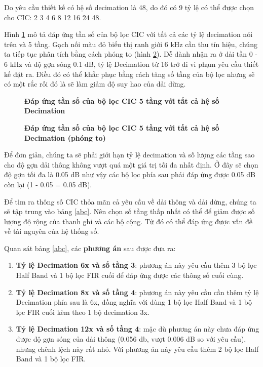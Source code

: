 Do yêu cầu thiết kế có hệ số decimation là 48, do đó có 9 tỷ lệ có thể được chọn cho CIC: 2 3 4 6 8 12 16 24 48.

Hình \ref{cic_ratios_overview} mô tả đáp ứng tần số của bộ lọc CIC với tất cả các tỷ lệ decimation nói trên và 5 tầng. Gạch nối màu đỏ biểu thị ranh giới 6 kHz cần thu tín hiệu, chúng ta tiếp tục phân tích bằng cách phóng to (hình \ref{cic_ratios_zoom}). Dễ dành nhận ra ở dải tần 0 - 6 kHz và độ gợn sóng 0.1 dB, tỷ lệ Decimation từ 16 trở đi vi phạm yêu cầu thiết kế đặt ra. Điều đó có thể khắc phục bằng cách tăng số tầng của bộ lọc nhưng sẽ có một rắc rối đó là sẽ làm giảm độ suy hao của dải dừng.

\begin{figure}[H]
    \centering
    
    \caption[Đáp ứng tần số của bộ lọc CIC 5 tầng với tất cả hệ số Decimation]{\bfseries \fontsize{12pt}{0pt}\selectfont Đáp ứng tần số của bộ lọc CIC 5 tầng với tất cả hệ số Decimation}
    \label{cic_ratios_overview}
\end{figure}

\begin{figure}[H]
    \centering
    
    \caption[Đáp ứng tần số của bộ lọc CIC 5 tầng với tất cả hệ số Decimation (phóng to)]{\bfseries \fontsize{12pt}{0pt}\selectfont Đáp ứng tần số của bộ lọc CIC 5 tầng với tất cả hệ số Decimation (phóng to)}
    \label{cic_ratios_zoom}
\end{figure}

Để đơn giản, chúng ta sẽ phải giới hạn tỷ lệ decimation và số lượng các tầng sao cho độ gợn dải thông không vượt quá một giá trị tối đa nhất định. Ở đây sẽ chọn độ gợn tối đa là 0.05 dB như vậy các bộ lọc phía sau phải đáp ứng được 0.05 dB còn lại (1 - 0.05 = 0.05 dB).

Để tìm ra thông số CIC thỏa mãn cả yêu cầu về dải thông và dải dừng, chúng ta sẽ tập trung vào bảng \ref{abc}. Nên chọn số tầng thấp nhất có thể để giảm được số lượng độ rộng của thanh ghi và các bộ cộng. Từ đó có thể đáp ứng được vấn đề về tài nguyên của hệ thống số.

 \noindent Quan sát bảng \ref{abc}, các \textbf{phương án} sau được đưa ra:
\begin{enumerate}
    \item \textbf{Tỷ lệ Decimation 6x và số tầng 3}: phương án này yêu cầu thêm 3 bộ lọc Half Band và 1 bộ lọc FIR cuối để đáp ứng được các thông số cuối cùng.
    \item \textbf{Tỷ lệ Decimation 8x và số tầng 4}: phương án này yêu cầu cần thêm tỷ lệ Decimation phía sau là 6x, đồng nghĩa với dùng 1 bộ lọc Half Band và 1 bộ lọc FIR cuối kèm theo 1 bộ decimation 3x.
    \item \textbf{Tỷ lệ Decimation 12x và số tầng 4}: mặc dù phương án này chưa đáp ứng được độ gợn sóng của dải thông (0.056 db, vượt 0.006 dB so với yêu cầu), nhưng chênh lệch này rất nhỏ. Với phương án này yêu cầu thêm 2 bộ lọc Half Band và 1 bộ lọc FIR. \label{choose}
\end{enumerate}

